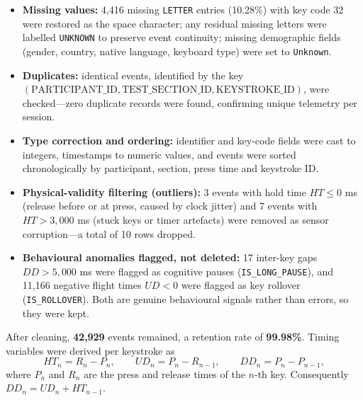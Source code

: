 \begin{itemize}
    \item \textbf{Missing values:} 4{,}416 missing \texttt{LETTER} entries (10.28\%) with key code 32 were restored as the space character; any residual missing letters were labelled \texttt{UNKNOWN} to preserve event continuity; missing demographic fields (gender, country, native language, keyboard type) were set to \texttt{Unknown}.
    \item \textbf{Duplicates:} identical events, identified by the key $(\text{PARTICIPANT\_ID},\text{TEST\_SECTION\_ID},\text{KEYSTROKE\_ID})$, were checked---zero duplicate records were found, confirming unique telemetry per session.
    \item \textbf{Type correction and ordering:} identifier and key-code fields were cast to integers, timestamps to numeric values, and events were sorted chronologically by participant, section, press time and keystroke ID.
    \item \textbf{Physical-validity filtering (outliers):} 3 events with hold time $HT\le 0$ ms (release before or at press, caused by clock jitter) and 7 events with $HT>3{,}000$ ms (stuck keys or timer artefacts) were removed as sensor corruption---a total of 10 rows dropped.
    \item \textbf{Behavioural anomalies flagged, not deleted:} 17 inter-key gaps $DD>5{,}000$ ms were flagged as cognitive pauses (\texttt{IS\_LONG\_PAUSE}), and 11{,}166 negative flight times $UD<0$ were flagged as key rollover (\texttt{IS\_ROLLOVER}). Both are genuine behavioural signals rather than errors, so they were kept.
\end{itemize}

After cleaning, \textbf{42{,}929} events remained, a retention rate of \textbf{99.98\%}. Timing variables were derived per keystroke as
\begin{equation}
HT_n=R_n-P_n,\qquad UD_n=P_n-R_{n-1},\qquad DD_n=P_n-P_{n-1},
\end{equation}
where $P_n$ and $R_n$ are the press and release times of the $n$-th key. Consequently $DD_n=UD_n+HT_{n-1}$.

